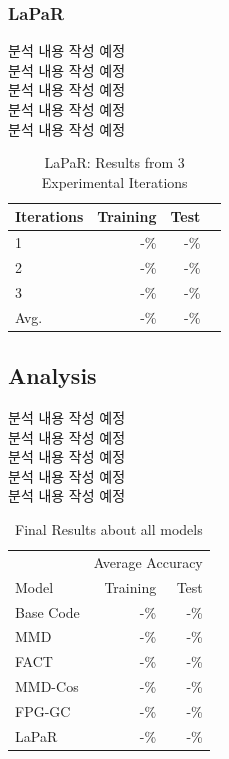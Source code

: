 \subsubsection{LaPaR}
분석 내용 작성 예정\\
분석 내용 작성 예정\\
분석 내용 작성 예정\\
분석 내용 작성 예정\\
분석 내용 작성 예정\\
\begin{table}[h]
  \centering
  \begin{tabular}{lrrr}
  \toprule
  Iterations & Training & Test \\
  \midrule
  1 & -\% & -\% \\
  2 & -\% & -\% \\
  3 & -\% & -\% \\
  Avg. & -\% & -\% \\
  \bottomrule
  \end{tabular}
  \caption{LaPaR: Results from 3 Experimental Iterations}
  \label{tab:LaPaR: Results from 3 Experimental Iterations}
\end{table}

\subsection{Analysis}
분석 내용 작성 예정\\
분석 내용 작성 예정\\
분석 내용 작성 예정\\
분석 내용 작성 예정\\
분석 내용 작성 예정\\
\begin{table}[h]
  \centering
  \begin{tabular}{lrr}
    \toprule
    & \multicolumn{2}{c}{Average Accuracy}\\
    \cmidrule(r){2-3}
    Model & Training & Test\\
    \midrule
    Base Code & -\% & -\%\\
    MMD & -\% & -\%\\
    FACT & -\% & -\%\\
    MMD-Cos & -\% & -\%\\
    FPG-GC & -\% & -\%\\
    LaPaR & -\% & -\%\\
    \bottomrule
  \end{tabular}
  \caption{Final Results about all models}
  \label{tab:Final Results about all models}
\end{table}


